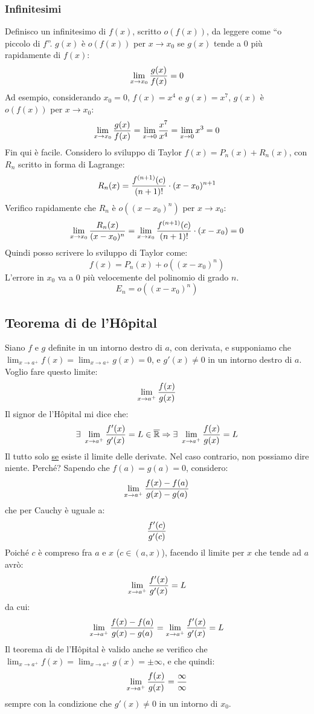 \documentclass[12pt,a4paper]{article}
\begin{document}
\subsubsection{Infinitesimi}
Definisco un infinitesimo di $f(x)$, scritto $o\left( f(x) \right)$,
da leggere come ``o piccolo di $f$''. $g(x)$ \`e $o\left( f(x) \right)$ 
per $x \to x_0$ se $g(x)$ tende a $0$ pi\`u rapidamente di $f(x)$:
$$
\lim_{x \to x_0} {g(x) \over f(x)} = 0
$$
Ad esempio, considerando $x_0 = 0$, $f(x) = x^4$ e $g(x) = x^7$, $g(x)$ \`e
$o(f(x))$ per $x \to x_0$:
$$
\lim_{x \to x_0} {g(x) \over f(x)} = \lim_{x \to 0} {x^7 \over x^4} =
\lim_{x \to 0} x^3 = 0
$$
Fin qui \`e facile. Considero lo sviluppo di Taylor $f(x) =
P_n(x) + R_n(x)$, con $R_n$ scritto in forma di Lagrange:
$$
R_n(x) = {f^{(n+1)} (c) \over (n+1)!} \cdot (x - x_0)^{n+1}
$$
Verifico rapidamente che $R_n$ \`e $o \left( (x - x_0)^n \right)$ per
$x \to x_0$:
$$
\lim_{x \to x_0} {R_n(x) \over (x - x_0)^n} = 
\lim_{x \to x_0} {f^{(n+1)} (c) \over (n+1)!} \cdot (x - x_0) = 0
$$
Quindi posso scrivere lo sviluppo di Taylor come:
$$
f(x) = P_n(x) + o \left( (x - x_0)^n \right)
$$
L'errore in $x_0$ va a $0$ pi\`u velocemente del polinomio di grado $n$.
$$
E_n = o \left( (x - x_0)^n \right)
$$

\subsection{Teorema di de l'H\^{o}pital}
Siano $f$ e $g$ definite in un intorno destro di $a$, con derivata, e
supponiamo che $\lim_{x \to a^+} f(x) = \lim_{x \to a^+} g(x) = 0$,
e $g'(x) \neq 0$ in un intorno destro di $a$. Voglio fare questo limite:
$$
\lim_{x \to a^+} {f(x) \over g(x)}
$$
Il signor de l'H\^{o}pital mi dice che:
$$
\exists \ \lim_{x \to a^+} {f'(x) \over g'(x)} = L \in \overline{\mathbb{R}}
\Rightarrow \exists \ \lim_{x \to a^+} {f(x) \over g(x)} = L
$$
Il tutto solo \underline{se} esiste il limite delle derivate. Nel caso 
contrario, non possiamo dire niente. Perch\'e? Sapendo che $f(a) = g(a)
= 0$, considero:
$$
\lim_{x \to a^+} {f(x) - f(a) \over g(x) - g(a)}
$$
che per Cauchy \`e uguale a:
$$
{f'(c) \over g'(c)}
$$
Poich\'e $c$ \`e compreso fra $a$ e $x$ ($c \in (a,x)$), facendo il limite
per $x$ che tende ad $a$ avr\`o:
$$
\lim_{x \to a^+} {f'(x) \over g'(x)} = L
$$
da cui:
$$
\lim_{x \to a^+} {f(x) - f(a) \over g(x) - g(a)} = 
\lim_{x \to a^+} {f'(x) \over g'(x)} = L
$$
Il teorema di de l'H\^{o}pital \`e valido anche se verifico che $\lim_{x
\to a^+} f(x) = \lim_{x \to a^+} g(x) = \pm \infty$, e che quindi:
$$
\lim_{x \to a^+} {f(x) \over g(x)} = {\infty \over \infty}
$$
sempre con la condizione che $g'(x) \neq 0$ in un intorno di $x_0$.
\end{document}
